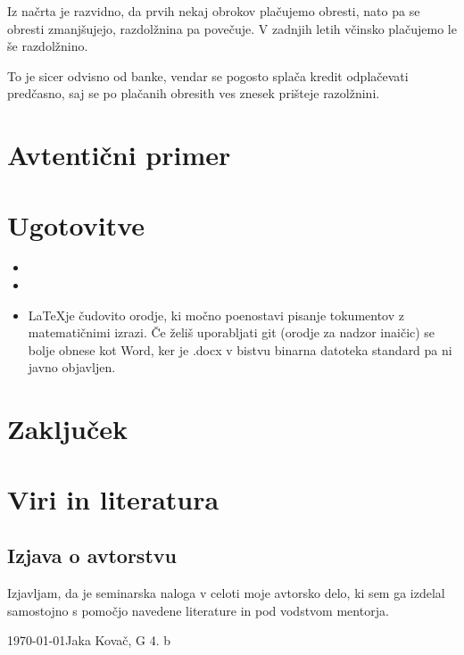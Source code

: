 \documentclass[12pt]{article}
\begin{document}
    Iz načrta je razvidno, da prvih nekaj obrokov plačujemo obresti, nato pa se obresti
    zmanjšujejo, razdolžnina pa povečuje. V zadnjih letih včinsko plačujemo le še razdolžnino.

    To je sicer odvisno od banke, vendar se pogosto splača kredit odplačevati predčasno, saj
    se po plačanih obresith ves znesek prišteje razolžnini. 
\section{Avtentični primer}
    



\section{Ugotovitve}
\begin{itemize}
    \item \quad
    \item \quad
    \item \LaTeX je čudovito orodje, ki močno poenostavi pisanje tokumentov z matematičnimi
    izrazi. Če želiš uporabljati git (orodje za nadzor inaičic) se bolje obnese kot Word,
    ker je .docx v bistvu binarna datoteka standard pa ni javno objavljen.
\end{itemize}

\newpage
\section{Zaključek}






\newpage
\begingroup
\makeatletter
    \section{Viri in literatura}
    \nocite{*}
    \printbibliography[heading=none]
\makeatother
\endgroup
\newpage

\begin{samepage}
    \thispagestyle{empty}
    \section*{Izjava o avtorstvu}
    Izjavljam, da je seminarska naloga v celoti moje avtorsko delo, ki sem ga 
    izdelal samostojno s pomočjo navedene literature in pod vodstvom mentorja.

    \vfill
    
    \today \hfill Jaka Kovač, G 4. b
    
    \vspace{3 cm}
\end{samepage}
\end{document}

